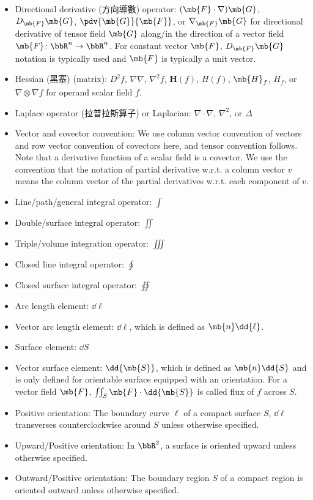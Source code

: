 \documentclass[a4paper,12pt]{report}
\begin{document}
\begin{itemize}
\begin{itemize}
\begin{itemize}
\item Directional derivative (方向導數) operator: $(\mb{F}\cdot\nabla)\mb{G}$, $D_{\mb{F}}\mb{G}$, $\pdv{\mb{G}}{\mb{F}}$, or $\nabla_{\mb{F}}\mb{G}$ for directional derivative of tensor field $\mb{G}$ along/in the direction of a vector field $\mb{F}\colon\bbR^n\to\bbR^n$. For constant vector $\mb{F}$, $D_{\mb{F}}\mb{G}$ notation is typically used and $\mb{F}$ is typically a unit vector.
\item Hessian (黑塞) (matrix): 
$D^2f$, $\nabla\nabla$, $\nabla^2f$, $\mathbf{H}(f)$, $H(f)$, $\mb{H}_f$, $H_f$, or $\nabla\otimes\nabla f$ for operand scalar field $f$.
\item Laplace operator (拉普拉斯算子) or Laplacian: $\nabla\cdot\nabla$, $\nabla^2$, or $\Delta$
\item Vector and covector convention: We use column vector convention of vectors and row vector convention of covectors here, and tensor convention follows. Note that a derivative function of a scalar field is a covector. We use the convention that the notation of partial derivative w.r.t. a column vector $v$ means the column vector of the partial derivatives w.r.t. each component of $v$.
\item Line/path/general integral operator: $\int$
\item Double/surface integral operator: $\iint$
\item Triple/volume integration operator: $\iiint$
\item Closed line integral operator: $\oint$
\item Closed surface integral operator: $\oiint$
\item Arc length element: $\dd{\ell}$
\item Vector arc length element: $\dd{\boldsymbol{\ell}}$, which is defined as $\mb{n}\dd{\ell}$.
\item Surface element: $\dd{S}$
\item Vector surface element: $\dd{\mb{S}}$, which is defined as $\mb{n}\dd{S}$ and is only defined for orientable surface equipped with an orientation. For a vector field $\mb{F}$, $\iint_S\mb{F}\cdot\dd{\mb{S}}$ is called flux of $f$ across $S$.
\item Positive orientation: The boundary curve $\ell$ of a compact surface $S$, $\dd{\boldsymbol{\ell}}$ transverses counterclockwise around $S$ unless otherwise specified.
\item Upward/Positive orientation: In $\bbR^2$, a surface is oriented upward unless otherwise specified.
\item Outward/Positive orientation: The boundary region $S$ of a compact region is oriented outward unless otherwise specified.
\end{itemize}

\end{itemize}
\end{itemize}
\end{document}
